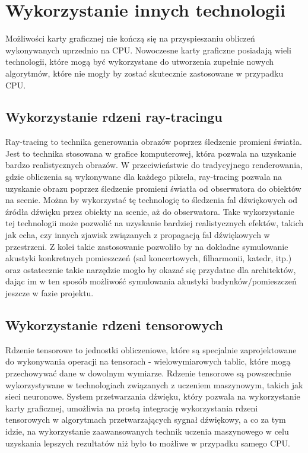 \section{Wykorzystanie innych technologii}
Możliwości karty graficznej nie kończą się na przyspieszaniu obliczeń wykonywanych uprzednio na CPU. Nowoczesne karty graficzne posiadają wieli technologii, które mogą być wykorzystane do utworzenia zupełnie nowych algorytmów, które nie mogły by zostać skutecznie zastosowane w przypadku CPU.

\subsection{Wykorzystanie rdzeni ray-tracingu}
Ray-tracing\cite{bib:ray-tracing-cores} to technika generowania obrazów poprzez śledzenie promieni światła. Jest to technika stosowana w grafice komputerowej, która pozwala na uzyskanie bardzo realistycznych obrazów. W przeciwieństwie do tradycyjnego renderowania, gdzie obliczenia są wykonywane dla każdego piksela, ray-tracing pozwala na uzyskanie obrazu poprzez śledzenie promieni światła od obserwatora do obiektów na scenie. Można by wykorzystać tę technologię to śledzenia fal dźwiękowych od źródła dźwięku przez obiekty na scenie, aż do obserwatora. Take wykorzystanie tej technologii może pozwolić na uzyskanie bardziej realistycznych efektów, takich jak echa, czy innych zjawisk związanych z propagacją fal dźwiękowych w przestrzeni. Z kolei takie zastosowanie pozwoliło by na dokładne symulowanie akustyki konkretnych pomieszczeń (sal koncertowych, filharmonii, katedr, itp.) oraz ostatecznie takie narzędzie mogło by okazać się przydatne dla architektów, dając im w ten sposób możliwość symulowania akustyki budynków/pomieszczeń jeszcze w fazie projektu.

\subsection{Wykorzystanie rdzeni tensorowych}
Rdzenie tensorowe\cite{bib:tensor-cores} to jednostki obliczeniowe, które są specjalnie zaprojektowane do wykonywania operacji na tensorach - wielowymiarowych tablic, które mogą przechowywać dane w dowolnym wymiarze. Rdzenie tensorowe są powszechnie wykorzystywane w technologiach związanych z uczeniem maszynowym, takich jak sieci neuronowe. System przetwarzania dźwięku, który pozwala na wykorzystanie karty graficznej, umożliwia na prostą integrację wykorzystania rdzeni tensorowych w algorytmach przetwarzających sygnał dźwiękowy, a co za tym idzie, na wykorzystanie zaawansowanych technik uczenia maszynowego w celu uzyskania lepszych rezultatów niż było to możliwe w przypadku samego CPU.

